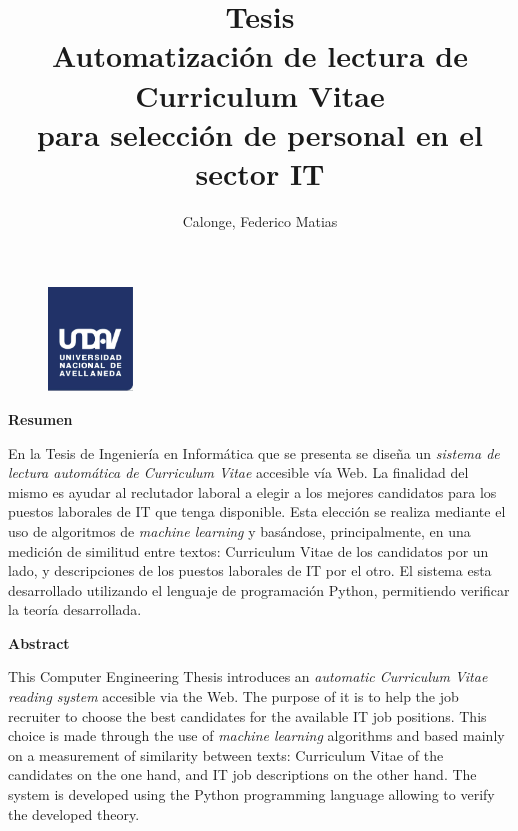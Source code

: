 \documentclass[12pt,a4paper]{article}
\author{
  Calonge, Federico Matias\\
  \text{calongefederico@gmail.com}
}
\title{
  Tesis \\
  \large Automatización de lectura de Curriculum Vitae  \\
    para selección de personal en el sector IT}
\begin{document}
\begin{sloppypar}
\begin{figure}
  \centering
  \includegraphics[width=0.2\textwidth]{images/undav-logo.png} 	%
  \label{fig:undav-logo}
\end{figure}
\maketitle       		%

\cleardoublepage    %

\begin{center}
    \Large
    \vspace{0.9cm}
    \textbf{Resumen}
    
\end{center}

En la Tesis de Ingeniería en Informática que se presenta se diseña un \textit{sistema de lectura automática de Curriculum Vitae} accesible vía Web. La finalidad del mismo es ayudar al reclutador laboral a elegir a los mejores candidatos para los puestos laborales de IT que tenga disponible. Esta elección se realiza mediante el uso de algoritmos de \textit{machine learning} y basándose, principalmente, en una medición de similitud entre textos: Curriculum Vitae de los candidatos por un lado, y descripciones de los puestos laborales de IT por el otro.
El sistema esta desarrollado utilizando el lenguaje de programación Python, permitiendo verificar la teoría desarrollada.

\begin{center}
    \Large
    \vspace{0.9cm}
    \textbf{Abstract}
\end{center}

This Computer Engineering Thesis introduces an \textit{automatic Curriculum Vitae reading system} accesible via the Web. The purpose of it is to help the job recruiter to choose the best candidates for the available IT job positions. This choice is made through the use of \textit{machine learning} algorithms and based mainly on a measurement of similarity between texts: Curriculum Vitae of the candidates on the one hand, and IT job descriptions on the other hand.
The system is developed using the Python programming language allowing to verify the developed theory.


\end{sloppypar}
\end{document}
